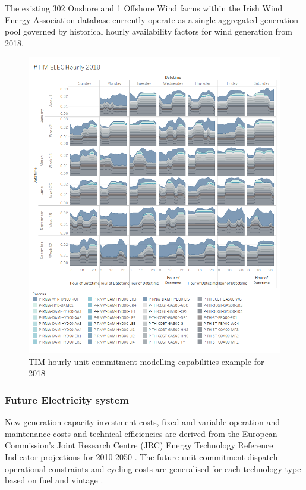 \documentclass[journal abbreviation, manuscript]{copernicus}
\begin{document}
The existing 302 Onshore and 1 Offshore Wind farms within the Irish Wind Energy Association database currently operate as a single aggregated generation pool governed by historical hourly availability factors for wind generation from 2018.

\begin{figure}[!htbp]
 \centering
 \includegraphics[scale=0.6]{TIM_Elec_Hourly (2).png} 
 \caption{TIM hourly unit commitment modelling capabilities example for 2018}
 \label{fig:TIM_HourlyELC}
\end{figure}

\subsubsection{Future Electricity system}
New generation capacity investment costs, fixed and variable operation and maintenance costs and technical efficiencies are derived from the European Commission's Joint Research Centre (JRC) Energy Technology Reference Indicator projections for 2010-2050 \cite{Carlsson2014}. The future unit commitment dispatch operational constraints and cycling costs are generalised for each technology type based on fuel and vintage \cite{Kumar2012}. 
\end{document}
